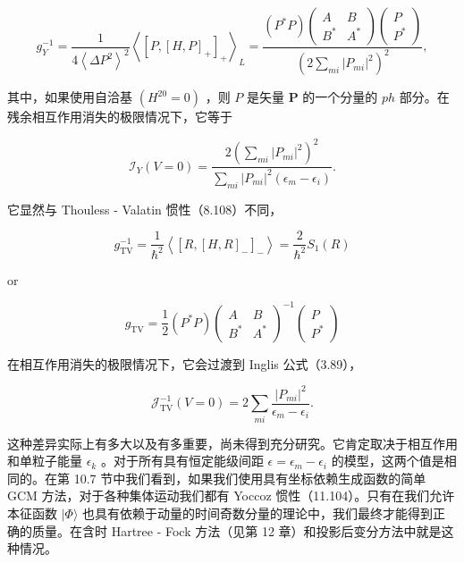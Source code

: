 \[
{g}^{-1}_{Y}=\frac{1}{4{\left\langle \Delta{P}^{2}\right\rangle }^{2}}{\left\langle {\left\lbrack P,{\left\lbrack H,P\right\rbrack }_{+}\right\rbrack }_{+}\right\rangle }_{L}=\frac{\left({{P}^{*}P}\right)\left(\begin{matrix}A & B\\
{B}^{*} & {A}^{*}
\end{matrix}\right)\left(\begin{matrix}P\\
{P}^{*}
\end{matrix}\right)}{{\left(2\mathop{\sum}\limits_{{mi}}{\left|{P}_{mi}\right|}^{2}\right)}^{2}},\tag{11.104}
\]

其中，如果使用自洽基 $\left({{H}^{20}=0}\right)$ ，则 $P$ 是矢量 $\boldsymbol{P}$
的一个分量的 ${ph}$ 部分。在残余相互作用消失的极限情况下，它等于

\[
{\mathcal{I}}_{Y}\left({V=0}\right)=\frac{2{\left(\mathop{\sum}\limits_{{mi}}{\left|{P}_{mi}\right|}^{2}\right)}^{2}}{\mathop{\sum}\limits_{{mi}}{\left|{P}_{mi}\right|}^{2}\left({{\epsilon}_{m}-{\epsilon}_{i}}\right)}.\tag{11.105}
\]

它显然与 Thouless - Valatin 惯性（8.108）不同，

\[
{g}^{-1}_{\mathrm{{TV}}}=\frac{1}{{\hbar}^{2}}\left\langle {\left\lbrack R,{\left\lbrack H,R\right\rbrack }_{-}\right\rbrack }_{-}\right\rangle =\frac{2}{{\hbar}^{2}}{S}_{1}\left(R\right)
\]

or

\[
{g}_{\mathrm{{TV}}}=\frac{1}{2}\left({{P}^{*}P}\right){\left(\begin{array}{ll}
A & B\\
{B}^{*} & {A}^{*}
\end{array}\right)}^{-1}\left(\begin{array}{l}
P\\
{P}^{*}
\end{array}\right)\tag{11.106}
\]

在相互作用消失的极限情况下，它会过渡到 Inglis 公式（3.89），

\[
\mathcal{J}^{-1}_{\text{TV}}(V=0)=2\sum_{mi}\frac{|P_{mi}|^{2}}{\epsilon_{m}-\epsilon_{i}}.\tag{11.107}
\]

这种差异实际上有多大以及有多重要，尚未得到充分研究。它肯定取决于相互作用和单粒子能量 ${\epsilon}_{k}$ 。对于所有具有恒定能级间距
$\epsilon={\epsilon}_{m}-{\epsilon}_{i}$ 的模型，这两个值是相同的。在第 10.7 节中我们看到，如果我们使用具有坐标依赖生成函数的简单
GCM 方法，对于各种集体运动我们都有 Yoccoz 惯性（11.104）。只有在我们允许本征函数 $|\Phi\rangle$
也具有依赖于动量的时间奇数分量的理论中，我们最终才能得到正确的质量。在含时 Hartree - Fock 方法（见第 12 章）和投影后变分方法中就是这种情况。

